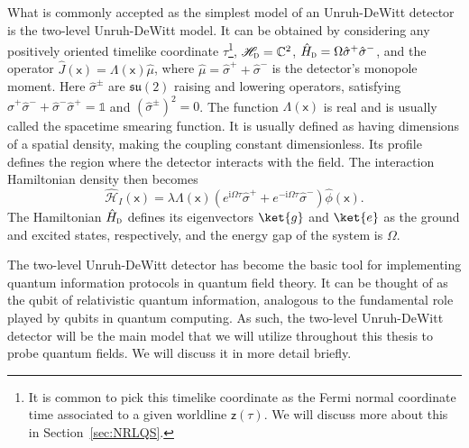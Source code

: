 \documentclass[letterpaper,12pt,titlepage,oneside,final]{book}
\newcommand{\openone}{\mathds{1}}
\newcommand{\mf}{\mathsf}%
\newcommand{\ii}{\mathrm{i}}
\newcommand{\tc}[1]{\textsc{#1}}
\begin{document}
What is commonly accepted as the simplest model of an Unruh-DeWitt detector is the two-level Unruh-DeWitt model. It can be obtained by considering any positively oriented timelike coordinate $\tau$\footnote{It is common to pick this timelike coordinate as the Fermi normal coordinate time associated to a given worldline $\mf z(\tau)$. We will discuss more about this in Section~\ref{sec:NRLQS}.}, ${\mathscr{H}}_\tc{d} = \mathbb{C}^2$, $\hat{H}_\tc{d} = \Omega\hat{\sigma}^+\hat{\sigma}^-$, and the operator $\hat{J}(\mf x) = \Lambda(\mf x) \hat{\mu}$, where $\hat{\mu} = \hat{\sigma}^+ + \hat{\sigma}^-$ is the detector's monopole moment. Here $\hat{\sigma}^\pm$ are $\mathfrak{su}(2)$ raising and lowering operators, satisfying $\hat{\sigma}^+\hat{\sigma}^- + \hat{\sigma}^-\hat{\sigma}^+ = \openone$ and $(\hat{\sigma}^\pm)^2 = 0$. The function $\Lambda(\mf x)$ is real and is usually called the spacetime smearing function. It is usually defined as having dimensions of a spatial density, making the coupling constant dimensionless. Its profile defines the region where the detector interacts with the field. The interaction Hamiltonian density then becomes
\begin{equation}\label{eq:HIUDW}
    \hat{\mathcal{H}}_I(\mf x) = \lambda \Lambda(\mf x) (e^{\ii \Omega \tau} \hat{\sigma}^+ + e^{-\ii \Omega \tau} \hat{\sigma}^-)\hat{\phi}(\mf x).
\end{equation}
The Hamiltonian $\hat{H}_\tc{d}$ defines its eigenvectors $\ket{g}$ and $\ket{e}$ as the ground and excited states, respectively, and the energy gap of the system is $\Omega$.

The two-level Unruh-DeWitt detector has become the basic tool for implementing quantum information protocols in quantum field theory. It can be thought of as the qubit of relativistic quantum information, analogous to the fundamental role played by qubits in quantum computing. As such, the two-level Unruh-DeWitt detector will be the main model that we will utilize throughout this thesis to probe quantum fields. We will discuss it in more detail briefly.
\end{document}

